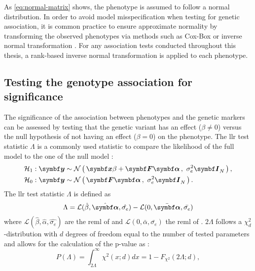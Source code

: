 As \cref{eq:normal-matrix} shows, the phenotype is assumed to follow a normal distribution. In order to avoid model misspecification when testing for genetic association, it is common practice to ensure approximate normality by transforming the observed phenotypes via methods such as Cox-Box \citep{Etzel2003,Yang2006} or inverse normal transformation \citep{Scuteri2007,Guan2008,Anttila2010,Casale2015}. For any association tests conducted throughout this thesis, a rank-based inverse normal transformation is applied to each phenotype.

\subsection{Testing the genotype association for significance}
\label{subsection:hypothesis-testing}
The significance of the association between phenotypes and the genetic markers can be assessed by testing that the genetic variant has an effect (\(\beta \neq 0\)) versus the null hypothesis \tnullH of not having an effect (\(\beta = 0\)) on the phenotype. The \gls{llr} test statistic \(\Lambda\) is a commonly used statistic to compare the likelihood of the full model \taltH to the one of the null model \tnullH:
%
\begin{align}
\altH&: \mat{y} \sim \normal {\mat{x}\beta + \mat{F}\mat{\alpha}} {\sigma_e^2\matsub{I}{N}},\label{eq:lm_alt} \\
\nullH&: \mat{y} \sim \normal {\mat{F}\mat{\alpha}} {\sigma_e^2\matsub{I}{N}}. \label{eq:lm_null}
\end{align}
%
The \gls{llr} test statistic \(\Lambda\) is defined as
\begin{equation}
\Lambda  =  \mathcal{L} (\hat{\beta}, \hat{\mat{\alpha}}, \hat{\sigma_{e}}) -  \mathcal{L} (0, \bar{\mat{\alpha}}, \bar{\sigma_{e}})
\label{eq:llr}
\end{equation}
%
where \(\mathcal{L} (\hat{\beta}, \hat{\alpha}, \hat{\sigma_{e}})\) are the \gls{reml} of \taltH and \(\mathcal{L} (0, \bar{\alpha}, \bar{\sigma_{e}})\) the \gls{reml} of \tnullH. \(2\Lambda\) follows a \(\chi^2_{d}\)-distribution with \(d\) degrees of freedom equal to the number of tested parameters \citep{Wilks1938} and allows for the calculation of the p-value as :
\begin{equation}
P(\Lambda) = \int_{2\Lambda}^{\infty} \chi^2 \left(x;d\right)dx = 1- F_{\chi^2}\left(2\Lambda; d\right),
\label{eq:pvalue}
\end{equation}
